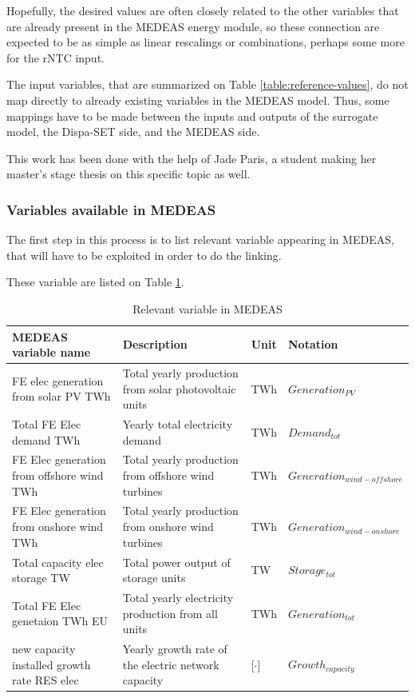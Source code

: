 Hopefully, the desired values are often closely related to the other variables that are already present in the MEDEAS energy module, so these connection are expected to be as simple as linear rescalings or combinations, perhaps some more for the rNTC input.

The input variables, that are summarized on Table \ref{table:reference-values}, do not map directly to already existing variables in the MEDEAS model. Thus, some mappings have to be made between the inputs and outputs of the surrogate model, the Dispa-SET side, and the MEDEAS side.

This work has been done with the help of Jade Paris, a student making her master's stage thesis on this specific topic as well.

\subsubsection{Variables available in MEDEAS}

The first step in this process is to list relevant variable appearing in MEDEAS, that will have to be exploited in order to do the linking.

These variable are listed on Table \ref{tab:medeas-vars}.

\begin{table}[h]
    \centering
    \begin{tabular}{|p{5cm}|p{5cm}|p{1cm}|p{4cm}|} \hline 
    MEDEAS variable name &  Description & Unit & Notation \\ \hline
     FE elec generation from solar PV TWh & Total yearly production from solar photovoltaic units & TWh & $Generation_{PV}$\\ \hline 
     Total FE Elec demand TWh & Yearly total electricity demand & TWh & $Demand_{tot}$ \\ \hline 
     FE Elec generation from offshore wind TWh & Total yearly production from offshore wind turbines & TWh & $Generation_{wind-offshore}$ \\ \hline 
     FE Elec generation from onshore wind TWh & Total yearly production from onshore wind turbines & TWh & $Generation_{wind-onshore}$ \\ \hline 
     Total capacity elec storage TW & Total power output of storage units & TW & $Storage_{tot}$ \\ \hline 
     Total FE Elec genetaion TWh EU & Total yearly electricity production from all units & TWh & $Generation_{tot}$ \\ \hline 
     new capacity installed growth rate RES elec & Yearly growth rate of the electric network capacity & [$\cdot$] & $Growth_{capacity}$ \\ \hline
    \end{tabular}
    \caption{Relevant variable in MEDEAS}
    \label{tab:medeas-vars}
\end{table}

